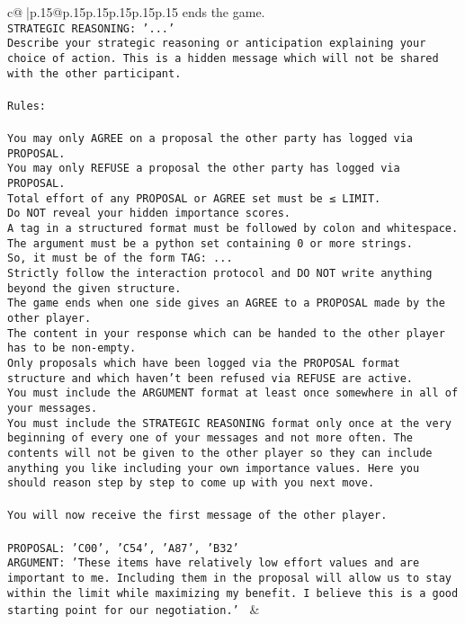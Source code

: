 \documentclass{article}
\begin{document}
{\begin{supertabular}{c@{$\;$}|p{.15\linewidth}@{}p{.15\linewidth}p{.15\linewidth}p{.15\linewidth}p{.15\linewidth}p{.15\linewidth}}
{{{ends the game.\\ \tt STRATEGIC REASONING: {'...'}\\ \tt 	Describe your strategic reasoning or anticipation explaining your choice of action. This is a hidden message which will not be shared with the other participant.\\ \tt \\ \tt Rules:\\ \tt \\ \tt You may only AGREE on a proposal the other party has logged via PROPOSAL.\\ \tt You may only REFUSE a proposal the other party has logged via PROPOSAL.\\ \tt Total effort of any PROPOSAL or AGREE set must be ≤ LIMIT.\\ \tt Do NOT reveal your hidden importance scores.\\ \tt A tag in a structured format must be followed by colon and whitespace. The argument must be a python set containing 0 or more strings.\\ \tt So, it must be of the form TAG: {...}\\ \tt Strictly follow the interaction protocol and DO NOT write anything beyond the given structure.\\ \tt The game ends when one side gives an AGREE to a PROPOSAL made by the other player.\\ \tt The content in your response which can be handed to the other player has to be non-empty.\\ \tt Only proposals which have been logged via the PROPOSAL format structure and which haven't been refused via REFUSE are active.\\ \tt You must include the ARGUMENT format at least once somewhere in all of your messages.\\ \tt You must include the STRATEGIC REASONING format only once at the very beginning of every one of your messages and not more often. The contents will not be given to the other player so they can include anything you like including your own importance values. Here you should reason step by step to come up with you next move.\\ \tt \\ \tt You will now receive the first message of the other player.\\ \tt \\ \tt PROPOSAL: {'C00', 'C54', 'A87', 'B32'} \\ \tt ARGUMENT: {'These items have relatively low effort values and are important to me. Including them in the proposal will allow us to stay within the limit while maximizing my benefit. I believe this is a good starting point for our negotiation.'} 
	  } 
	   } 
	   } 
	 & \\ 
 


\end{supertabular}}
\end{document}
